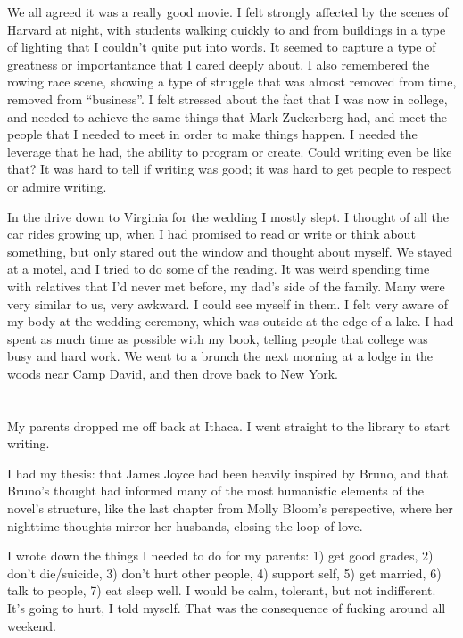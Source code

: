 We all agreed it was a really good movie.  I felt strongly affected by the
scenes of Harvard at night, with students walking quickly to and from buildings
in a type of lighting that I couldn't quite put into words.  It seemed to
capture a type of greatness or importantance that I cared deeply about.  I also
remembered the rowing race scene, showing a type of struggle that was almost
removed from time, removed from ``business''.  I felt stressed about the fact
that I was now in college, and needed to achieve the same things that Mark
Zuckerberg had, and meet the people that I needed to meet in order to make
things happen.  I needed the leverage that he had, the ability to program or
create.  Could writing even be like that?  It was hard to tell if writing was
good; it was hard to get people to respect or admire writing.

In the drive down to Virginia for the wedding I mostly slept.  I thought of all
the car rides growing up, when I had promised to read or write or think about
something, but only stared out the window and thought about myself.  We stayed
at a motel, and I tried to do some of the reading.  It was weird spending time
with relatives that I'd never met before, my dad's side of the family.  Many
were very similar to us, very awkward.  I could see myself in them.  I felt very
aware of my body at the wedding ceremony, which was outside at the edge of a
lake.  I had spent as much time as possible with my book, telling people that
college was busy and hard work.  We went to a brunch the next morning at a lodge
in the woods near Camp David, and then drove back to New York.

\section{}

My parents dropped me off back at Ithaca.  I went straight to the library to
start writing.

I had my thesis: that James Joyce had been heavily inspired by Bruno, and that
Bruno's thought had informed many of the most humanistic elements of the novel's
structure, like the last chapter from Molly Bloom's perspective, where her
nighttime thoughts mirror her husbands, closing the loop of love.

I wrote down the things I needed to do for my parents: 1) get good grades, 2)
don't die/suicide, 3) don't hurt other people, 4) support self, 5) get married,
6) talk to people, 7) eat sleep well.  I would be calm, tolerant, but not
indifferent.  It's going to hurt, I told myself.  That was the consequence of
fucking around all weekend.



